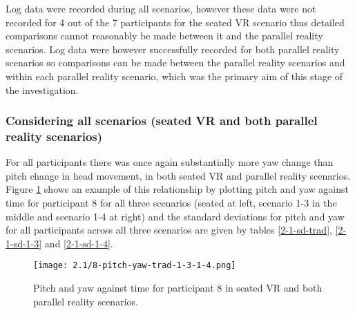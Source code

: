 Log data were recorded during all scenarios, however these data were not recorded for 4 out of the 7 participants for the seated VR scenario thus detailed comparisons cannot reasonably be made between it and the parallel reality scenarios. Log data were however successfully recorded for both parallel reality scenarios so comparisons can be made between the parallel reality scenarios and within each parallel reality scenario, which was the primary aim of this stage of the investigation.


\subsubsection{Considering all scenarios (seated VR and both parallel reality scenarios)}

For all participants there was once again substantially more yaw change than pitch change in head movement, in both seated VR and parallel reality scenarios. Figure \ref{2-1-8-pitch-yaw-trad-1-3-1-4.png} shows an example of this relationship by plotting pitch and yaw against time for participant 8 for all three scenarios (seated at left, scenario 1-3 in the middle and scenario 1-4 at right) and the standard deviations for pitch and yaw for all participants across all three scenarios are given by tables \ref{2-1-sd-trad}, \ref{2-1-sd-1-3} and \ref{2-1-sd-1-4}.

\begin{figure}
	\begin{center}
	\texttt{[image: 2.1/8-pitch-yaw-trad-1-3-1-4.png]}
	\caption{Pitch and yaw against time for participant 8 in seated VR and both parallel reality scenarios.}
	\label{2-1-8-pitch-yaw-trad-1-3-1-4.png}
	\end{center}
\end{figure}

